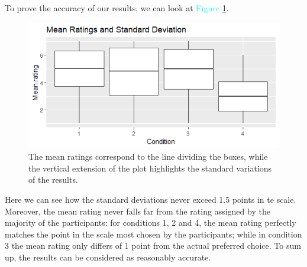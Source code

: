 \documentclass[12pt,a4paper]{article}
\begin{document}
To prove the accuracy of our results, we can look at \textcolor{cyan}{Figure \ref{Figure 2}}. 

\begin{figure}[h]
\centering
\captionsetup{font=scriptsize}
  \includegraphics[width=1\textwidth]{MeanRat.PNG}
  \caption{The mean ratings correspond to the line dividing the boxes, while the vertical extension of the plot highlights the standard variations of the results.}
  \label{Figure 2}
\end{figure}

Here we can see how the standard deviations never exceed 1.5 points in te scale. Moreover, the mean rating never falls far from the rating assigned by the majority of the participants: for conditions 1, 2 and 4, the mean rating perfectly matches the point in the scale most chosen by the participants; while in condition 3 the mean rating only differs of 1 point from the actual preferred choice. To sum up, the results can be considered as reasonably accurate.

\vspace{2cm}

\printnoidxglossaries

\newpage

\printbibliography

\newpage


\end{document}
